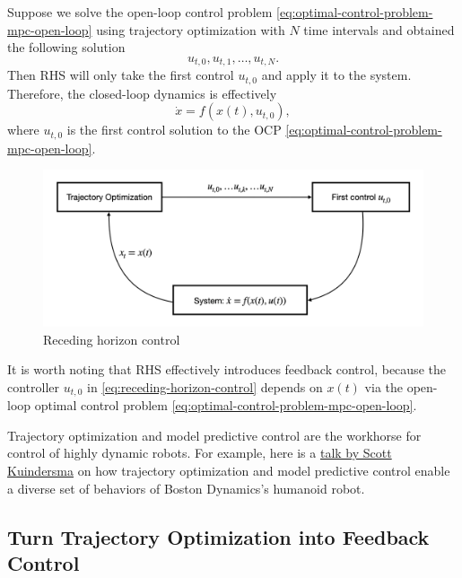 \documentclass[
]{book}
\theoremstyle{definition}
\theoremstyle{definition}
\theoremstyle{definition}
\theoremstyle{definition}
\theoremstyle{remark}
\begin{document}
Suppose we solve the open-loop control problem \eqref{eq:optimal-control-problem-mpc-open-loop} using trajectory optimization with \(N\) time intervals and obtained the following solution
\[
u_{t,0},u_{t,1},\dots,u_{t,N}.
\]
Then RHS will only take the first control \(u_{t,0}\) and apply it to the system. Therefore, the closed-loop dynamics is effectively
\begin{equation}
\dot{x} = f(x(t),u_{t,0}),
\label{eq:receding-horizon-control}
\end{equation}
where \(u_{t,0}\) is the first control solution to the OCP \eqref{eq:optimal-control-problem-mpc-open-loop}.

\begin{figure}

{\centering \includegraphics[width=0.8\linewidth]{images/receding_horizon_control} 

}

\caption{Receding horizon control}\label{fig:receding-horizon-control}
\end{figure}

It is worth noting that RHS effectively introduces feedback control, because the controller \(u_{t,0}\) in \eqref{eq:receding-horizon-control} depends on \(x(t)\) via the open-loop optimal control problem \eqref{eq:optimal-control-problem-mpc-open-loop}.

Trajectory optimization and model predictive control are the workhorse for control of highly dynamic robots. For example, here is a \href{https://youtu.be/EGABAx52GKI?feature=shared}{talk by Scott Kuindersma} on how trajectory optimization and model predictive control enable a diverse set of behaviors of Boston Dynamics's humanoid robot.

\hypertarget{turn-trajectory-optimization-into-feedback-control}{%
\subsection{Turn Trajectory Optimization into Feedback Control}\label{turn-trajectory-optimization-into-feedback-control}}
\end{document}
